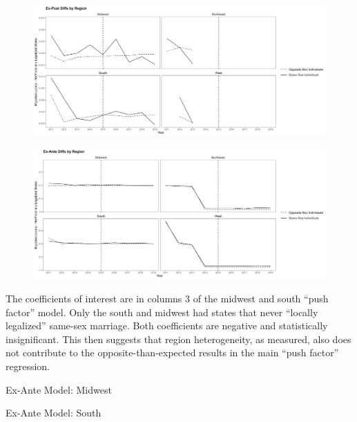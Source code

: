 \documentclass[12pt,letterpaper]{article}
\begin{document}
\begin{figure}[p]
    \centering
    \includegraphics[width=1\linewidth]{outputs/summary_stats/region_post_diffs.png}
    \caption{}
    \label{fig: region_post_diffs}
\end{figure}

\begin{figure}[p]
    \centering
    \includegraphics[width=1\linewidth]{outputs/summary_stats/region_ante_diffs.png}
    \caption{}
    \label{fig: region_ante_diffs}
\end{figure}

The coefficients of interest are in columns 3 of the midwest and south “push factor” model. Only the south and midwest had states that never “locally legalized” same-sex marriage. Both coefficients are negative and statistically insignificant. This then suggests that region heterogeneity, as measured, also does not contribute to the opposite-than-expected results in the main “push factor” regression. 

\clearpage
\begin{table}[p] %
    \centering
    \caption{Ex-Ante Model: Midwest}
    \label{tab: midwest_exante_model}
    
\end{table}
\begin{table}[p]
    \centering
    \caption{Ex-Ante Model: South}
    \label{tab: south_exante_model}
    
\end{table}
\end{document}
